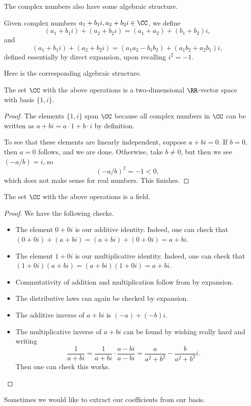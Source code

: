 The complex numbers also have some algebraic structure.
\begin{definition}
	Given complex numbers $a_1+b_1i,a_2+b_2i\in\CC$, we define
	\[(a_1+b_1i)+(a_2+b_2i)=(a_1+a_2)+(b_1+b_2)i,\]
	and
	\[(a_1+b_1i)+(a_2+b_2i)=(a_1a_2-b_1b_2)+(a_1b_2+a_2b_1)i,\]
	defined essentially by direct expansion, upon recalling $i^2=-1$.
\end{definition}
Here is the corresponding algebraic structure.
\begin{proposition}
	The set $\CC$ with the above operations is a two-dimensional $\RR$-vector space with basis $\{1,i\}$.
\end{proposition}
\begin{proof}
	The elements $\{1,i\}$ span $\CC$ because all complex numbers in $\CC$ can be written as $a+bi=a\cdot1+b\cdot i$ by definition.
	
	To see that these elements are linearly independent, suppose $a+bi=0$. If $b=0$, then $a=0$ follows, and we are done. Otherwise, take $b\ne0$, but then we see $(-a/b)=i$, so
	\[(-a/b)^2=-1<0,\]
	which does not make sense for real numbers. This finishes.
\end{proof}
\begin{proposition}
	The set $\CC$ with the above operations is a field.
\end{proposition}
\begin{proof}
	We have the following checks.
	\begin{itemize}
		\item The element $0+0i$ is our additive identity. Indeed, one can check that $(0+0i)+(a+bi)=(a+bi)+(0+0i)=a+bi$.
		\item The element $1+0i$ is our multiplicative identity. Indeed, one can check that $(1+0i)(a+bi)=(a+bi)(1+0i)=a+bi$.
		\item Commutativity of addition and multiplication follow from by expansion.
		\item The distributive laws can again be checked by expansion.
		\item The additive inverse of $a+bi$ is $(-a)+(-b)i$.
		\item The multiplicative inverse of $a+bi$ can be found by wishing really hard and writing
		\[\frac1{a+bi}=\frac1{a+bi}\cdot\frac{a-bi}{a-bi}=\frac a{a^2+b^2}-\frac b{a^2+b^2}i.\]
		Then one can check this works.
		\qedhere
	\end{itemize}
\end{proof}
Sometimes we would like to extract our coefficients from our basis.
